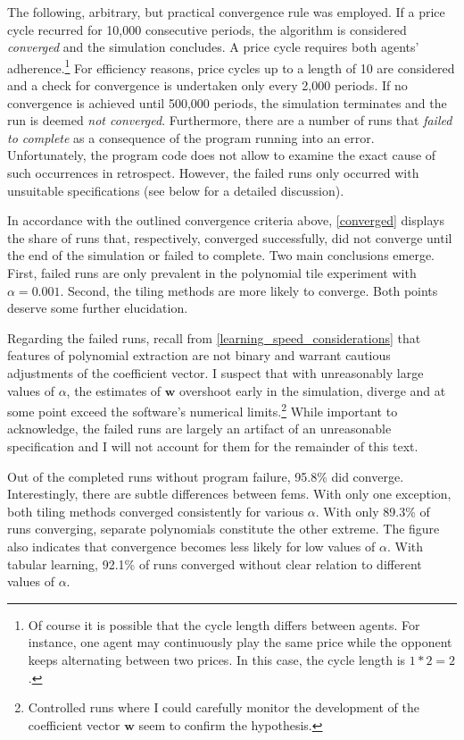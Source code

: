 The following, arbitrary, but practical convergence rule was employed. If a price cycle recurred for 10,000 consecutive periods, the algorithm is considered \emph{converged} and the simulation concludes. A price cycle requires both agents' adherence.\footnote{Of course it is possible that the cycle length differs between agents. For instance, one agent may continuously play the same price while the opponent keeps alternating between two prices. In this case, the cycle length is $1*2=2$.} For efficiency reasons, price cycles up to a length of 10 are considered and a check for convergence is undertaken only every 2,000 periods. If no convergence is achieved until 500,000 periods, the simulation terminates and the run is deemed \emph{not converged}. Furthermore, there are a number of runs that \emph{failed to complete} as a consequence of the program running into an error. Unfortunately, the program code does not allow to examine the exact cause of such occurrences in retrospect. However, the failed runs only occurred with unsuitable specifications (see below for a detailed discussion).

In accordance with the outlined convergence criteria above, \autoref{converged} displays the share of runs that, respectively, converged successfully, did not converge until the end of the simulation or failed to complete. Two main conclusions emerge. First, failed runs are only prevalent in the polynomial tile experiment with $\alpha = 0.001$. Second, the tiling methods are more likely to converge. Both points deserve some further elucidation.

Regarding the failed runs, recall from \autoref{learning_speed_considerations} that features of polynomial extraction are not binary and warrant cautious adjustments of the coefficient vector. I suspect that with unreasonably large values of $\alpha$, the estimates of $\boldsymbol{w}$ overshoot early in the simulation, diverge and at some point exceed the software's numerical limits.\footnote{Controlled runs where I could carefully monitor the development of the coefficient vector $\boldsymbol{w}$ seem to confirm the hypothesis.} While important to acknowledge, the failed runs are largely an artifact of an unreasonable specification and I will not account for them for the remainder of this text.

Out of the completed runs without program failure, 95.8\% did converge. Interestingly, there are subtle differences between \gls{fem}s. With only one exception, both tiling methods converged consistently for various $\alpha$. With only 89.3\% of runs converging, separate polynomials constitute the other extreme. The figure also indicates that convergence becomes less likely for low values of $\alpha$. With tabular learning, 92.1\% of runs converged without clear relation to different values of $\alpha$.

